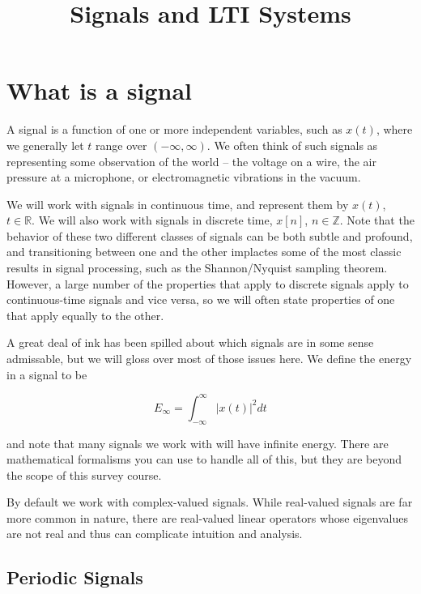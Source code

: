

\title{Signals and LTI Systems}

\maketitle



\section{What is a signal }

A signal is a function of one or more independent variables, such as
$x(t)$, where we generally let $t$ range over $(-\infty, \infty)$. We
often think of such signals as representing some observation of the
world -- the voltage on a wire, the air pressure at a microphone, or
electromagnetic vibrations in the vacuum.

We will work with signals in continuous time, and represent them by
$x(t)$, $t \in \mathbb{R}$. We will also work with signals in discrete
time, $x[n]$, $n \in \mathbb{Z}$. Note that the behavior of these two
different classes of signals can be both subtle and profound, and
transitioning between one and the other implactes some of the most
classic results in signal processing, such as the Shannon/Nyquist
sampling theorem. However, a large number of the properties that apply
to discrete signals apply to continuous-time signals and vice versa,
so we will often state properties of one that apply equally to the
other. 


A great deal of ink has been spilled about which signals are
in some sense admissable, but we will gloss over most of those
issues here. We define the energy in a signal to be

\[
E_\infty = \int_{-\infty}^{\infty} |x(t)|^2 dt
\]

and note that many signals we work with will have infinite energy. 
There are mathematical formalisms you can use to handle all of this, 
but they are beyond the scope of this survey course. 


By default we work with complex-valued signals. While
real-valued signals are far more common in nature, there
are real-valued linear operators whose eigenvalues
are not real and thus can complicate intuition and analysis. 


\subsection{Periodic Signals}

